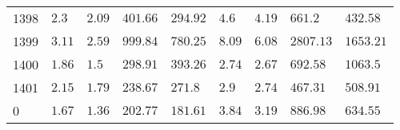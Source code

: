 \begin{tabular}{lllllllll}
1398 & \(\mathrm{2.3}\) & \(\mathrm{2.09}\) & \(\mathrm{401.66}\) & \(\mathrm{294.92}\) & \(\mathrm{4.6}\) & \(\mathrm{4.19}\) & \(\mathrm{661.2}\) & \(\mathrm{432.58}\) \\
1399 & \(\mathrm{3.11}\) & \(\mathrm{2.59}\) & \(\mathrm{999.84}\) & \(\mathrm{780.25}\) & \(\mathrm{8.09}\) & \(\mathrm{6.08}\) & \(\mathrm{2807.13}\) & \(\mathrm{1653.21}\) \\
1400 & \(\mathrm{1.86}\) & \(\mathrm{1.5}\) & \(\mathrm{298.91}\) & \(\mathrm{393.26}\) & \(\mathrm{2.74}\) & \(\mathrm{2.67}\) & \(\mathrm{692.58}\) & \(\mathrm{1063.5}\) \\
1401 & \(\mathrm{2.15}\) & \(\mathrm{1.79}\) & \(\mathrm{238.67}\) & \(\mathrm{271.8}\) & \(\mathrm{2.9}\) & \(\mathrm{2.74}\) & \(\mathrm{467.31}\) & \(\mathrm{508.91}\) \\
0 & \(\mathrm{1.67}\) & \(\mathrm{1.36}\) & \(\mathrm{202.77}\) & \(\mathrm{181.61}\) & \(\mathrm{3.84}\) & \(\mathrm{3.19}\) & \(\mathrm{886.98}\) & \(\mathrm{634.55}\) \\
\bottomrule
\end{tabular}
